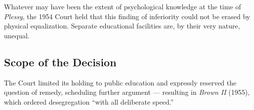 Whatever may have been the extent of psychological knowledge at the time of \textit{Plessy},
the 1954 Court held that this finding of inferiority could not be erased by physical
equalization.  Separate educational facilities are, by their very nature, unequal.

\subsection{Scope of the Decision}

The Court limited its holding to public education and expressly reserved the question of
remedy, scheduling further argument --- resulting in \textit{Brown II} (1955), which ordered
desegregation ``with all deliberate speed.''

